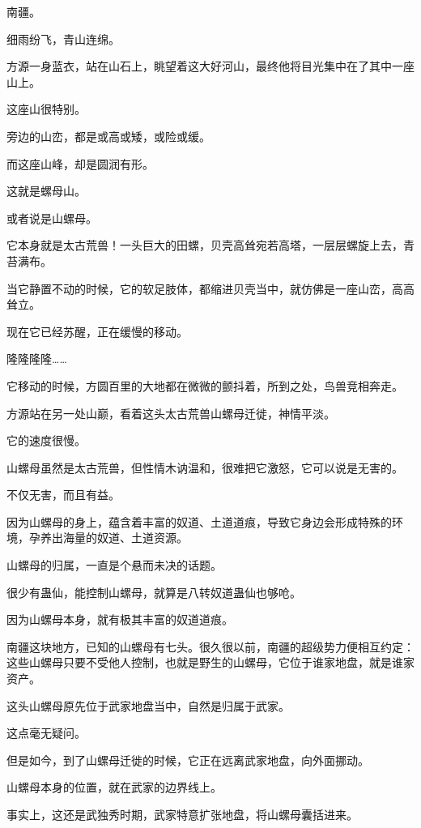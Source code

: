 
\begin{this_body}

南疆。

细雨纷飞，青山连绵。

方源一身蓝衣，站在山石上，眺望着这大好河山，最终他将目光集中在了其中一座山上。

这座山很特别。

旁边的山峦，都是或高或矮，或险或缓。

而这座山峰，却是圆润有形。

这就是螺母山。

或者说是山螺母。

它本身就是太古荒兽！一头巨大的田螺，贝壳高耸宛若高塔，一层层螺旋上去，青苔满布。

当它静置不动的时候，它的软足肢体，都缩进贝壳当中，就仿佛是一座山峦，高高耸立。

现在它已经苏醒，正在缓慢的移动。

隆隆隆隆……

它移动的时候，方圆百里的大地都在微微的颤抖着，所到之处，鸟兽竞相奔走。

方源站在另一处山巅，看着这头太古荒兽山螺母迁徙，神情平淡。

它的速度很慢。

山螺母虽然是太古荒兽，但性情木讷温和，很难把它激怒，它可以说是无害的。

不仅无害，而且有益。

因为山螺母的身上，蕴含着丰富的奴道、土道道痕，导致它身边会形成特殊的环境，孕养出海量的奴道、土道资源。

山螺母的归属，一直是个悬而未决的话题。

很少有蛊仙，能控制山螺母，就算是八转奴道蛊仙也够呛。

因为山螺母本身，就有极其丰富的奴道道痕。

南疆这块地方，已知的山螺母有七头。很久很以前，南疆的超级势力便相互约定：这些山螺母只要不受他人控制，也就是野生的山螺母，它位于谁家地盘，就是谁家资产。

这头山螺母原先位于武家地盘当中，自然是归属于武家。

这点毫无疑问。

但是如今，到了山螺母迁徙的时候，它正在远离武家地盘，向外面挪动。

山螺母本身的位置，就在武家的边界线上。

事实上，这还是武独秀时期，武家特意扩张地盘，将山螺母囊括进来。


\end{this_body}
